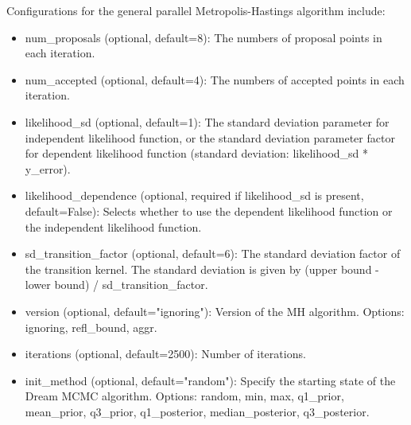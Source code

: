 Configurations for the general parallel Metropolis-Hastings algorithm include:
\begin{itemize}
    \item num\_proposals (optional, default=8): The numbers of proposal points in each iteration.
    \item num\_accepted (optional, default=4): The numbers of accepted points in each iteration.
    \item likelihood\_sd (optional, default=1): The standard deviation parameter for independent likelihood function, or the standard deviation parameter factor for dependent likelihood function (standard deviation: likelihood\_sd * y\_error).
    \item likelihood\_dependence (optional, required if likelihood\_sd is present, default=False): Selects whether to use the dependent likelihood function or the independent likelihood function.
    \item sd\_transition\_factor (optional, default=6): The standard deviation factor of the transition kernel. The standard deviation is given by (upper bound - lower bound) / sd\_transition\_factor.
    \item version (optional, default="ignoring"): Version of the MH algorithm. Options: ignoring, refl\_bound, aggr.
    \item iterations (optional, default=2500): Number of iterations.
    \item init\_method (optional, default="random"): Specify the starting state of the Dream MCMC algorithm. Options: random, min, max, q1\_prior, mean\_prior, q3\_prior, q1\_posterior, median\_posterior, q3\_posterior.
\end{itemize}

